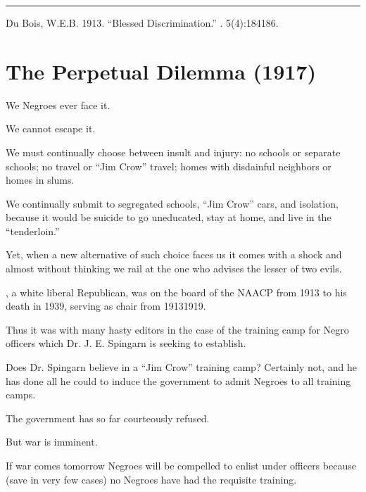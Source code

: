 \documentclass[letterpaper,10pt,english]{jupyterBook}
\begin{document}
\bigskip\hrule\bigskip


\sphinxAtStartPar
{} Du Bois, W.E.B. 1913. “Blessed Discrimination.”  . 5(4):184\sphinxhyphen{}186.


\section{The Perpetual Dilemma (1917)}
\label{\detokenize{Volumes/13/06/perpetual_dilemma:the-perpetual-dilemma-1917}}\label{\detokenize{Volumes/13/06/perpetual_dilemma::doc}}
\sphinxAtStartPar
We Negroes ever face it.

\sphinxAtStartPar
We cannot escape it.

\sphinxAtStartPar
We must continually choose between insult and injury: no schools or separate schools; no travel or “Jim Crow” travel; homes with disdainful neighbors or homes in slums.

\sphinxAtStartPar
We continually submit to segregated schools, “Jim Crow” cars, and isolation, because it would be suicide to go uneducated, stay at home, and live in the “tenderloin.”

\sphinxAtStartPar
Yet, when a new alternative of such choice faces us it comes with a shock and almost without thinking we rail at the one who advises the lesser of two evils.

\begin{sphinxShadowBox}
\sphinxstylesidebartitle{}

\sphinxAtStartPar
{}, a white liberal Republican, was on the board of the NAACP from 1913 to his death in 1939, serving as chair from 1913\sphinxhyphen{}1919.
\end{sphinxShadowBox}

\sphinxAtStartPar
Thus it was with many hasty edi­tors in the case of the training camp for Negro officers which Dr. J. E. Spingarn is seeking to establish.

\sphinxAtStartPar
Does Dr. Spingarn believe in a “Jim Crow” training camp? Certainly not, and he has done all he could to induce the government to admit Negroes to all training camps.

\sphinxAtStartPar
The government has so far courteously refused.

\sphinxAtStartPar
But war is imminent.

\sphinxAtStartPar
If war comes to\sphinxhyphen{}morrow Negroes will be compelled to enlist under  officers because (save in very few cases) no Negroes have had the requisite training.
\end{document}
